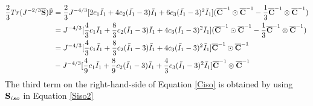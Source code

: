 \begin{equation} \label{part22}
\begin{split}
\frac{2}{3}Tr(J^{-2/3}\overline{\bold{S}}) \tilde{\mathbb{P}}
&= \frac{2}{3}J^{-4/3} [2c_1\bar{I}_1 + 4c_2(\bar{I_1} - 3)\bar{I}_1 + 6c_3(\bar{I_1} - 3)^2\bar{I}_1] ({\overline{\bold{C}}}^{-1} \odot {\overline{\bold{C}}}^{-1} - \frac{1}{3}{\overline{\bold{C}}}^{-1} \otimes {\overline{\bold{C}}}^{-1}) \\
&= J^{-4/3}[\frac{4}{3}c_1{\bar{I}}_1 + \frac{8}{3}c_2({\bar{I}}_1 - 3){\bar{I}}_1 + 4c_3({\bar{I}}_1 - 3)^2{\bar{I}}_1]({\overline{\bold{C}}}^{-1} \odot {\overline{\bold{C}}}^{-1} - \frac{1}{3}{\overline{\bold{C}}}^{-1} \otimes {\overline{\bold{C}}}^{-1}) \\
&= J^{-4/3} [\frac{4}{3}c_1{\bar{I}}_1 + \frac{8}{3}c_2({\bar{I}}_1 - 3){\bar{I}}_1 + 4c_3({\bar{I}}_1 - 3)^2{\bar{I}}_1]{\overline{\bold{C}}}^{-1} \odot {\overline{\bold{C}}}^{-1} \\
&-  J^{-4/3}[\frac{4}{9}c_1{\bar{I}}_1 + \frac{8}{9}c_2({\bar{I}}_1 - 3){\bar{I}}_1 + \frac{4}{3}c_3({\bar{I}}_1 - 3)^2{\bar{I}}_1]{\overline{\bold{C}}}^{-1} \otimes {\overline{\bold{C}}}^{-1} 
\end{split}
\end{equation}
The third term on the right-hand-side of Equation \ref{Ciso} is obtained by using $\bold{S}_{iso}$ in Equation \ref{Siso2}

